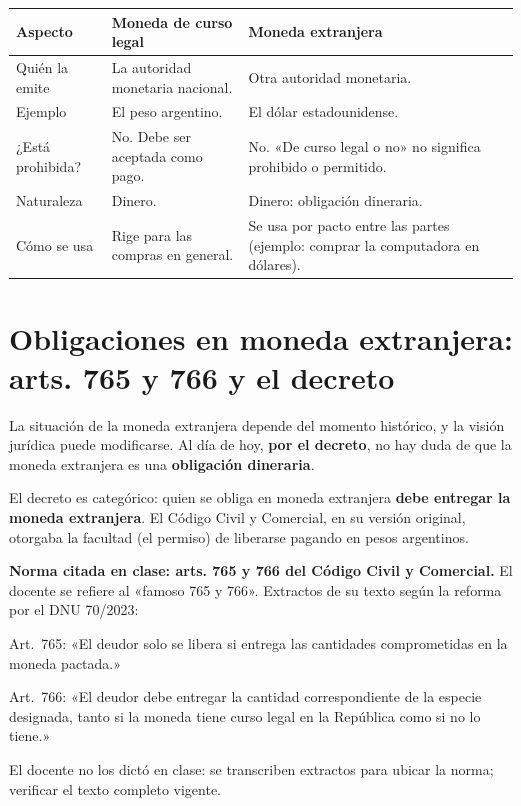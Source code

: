 \documentclass[12pt,oneside]{book}
\begin{document}
\begin{table}[H]
\centering
\begin{tabularx}{\textwidth}{
    >{\raggedright\arraybackslash}p{}
    >{\raggedright\arraybackslash}X
    >{\raggedright\arraybackslash}X
}
\toprule
\textbf{Aspecto} & \textbf{Moneda de curso legal} & \textbf{Moneda extranjera} \\
\midrule
Quién la emite & La autoridad monetaria nacional. & Otra autoridad monetaria. \\
Ejemplo & El peso argentino. & El dólar estadounidense. \\
¿Está prohibida? & No. Debe ser aceptada como pago. & No. «De curso legal o no» no significa prohibido o permitido. \\
Naturaleza & Dinero. & Dinero: obligación dineraria. \\
Cómo se usa & Rige para las compras en general. & Se usa por pacto entre las partes (ejemplo: comprar la computadora en dólares). \\
\bottomrule
\end{tabularx}
\end{table}

\section{Obligaciones en moneda extranjera: arts. 765 y 766 y el decreto}

La situación de la moneda extranjera depende del momento histórico, y la visión jurídica puede modificarse. Al día de hoy, \textbf{por el decreto}, no hay duda de que la moneda extranjera es una \textbf{obligación dineraria}.

El decreto es categórico: quien se obliga en moneda extranjera \textbf{debe entregar la moneda extranjera}. El Código Civil y Comercial, en su versión original, otorgaba la facultad (el permiso) de liberarse pagando en pesos argentinos.

\begin{note}
\textbf{Norma citada en clase: arts. 765 y 766 del Código Civil y Comercial.} El docente se refiere al «famoso 765 y 766». Extractos de su texto según la reforma por el DNU 70/2023:

Art.~765: «El deudor solo se libera si entrega las cantidades comprometidas en la moneda pactada.»

Art.~766: «El deudor debe entregar la cantidad correspondiente de la especie designada, tanto si la moneda tiene curso legal en la República como si no lo tiene.»

El docente no los dictó en clase: se transcriben extractos para ubicar la norma; verificar el texto completo vigente.
\end{note}
\end{document}
